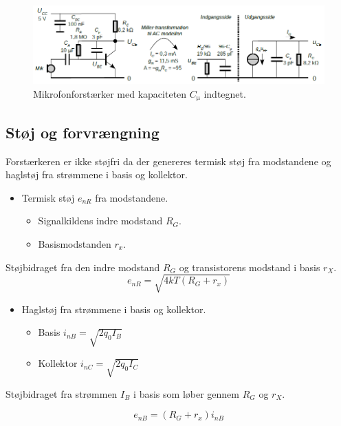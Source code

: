 \documentclass[danish]{article}
\begin{document}
\begin{figure} [H]
	\centering
	\includegraphics[width=\linewidth]{graphics/millertransformation}
	\caption{Mikrofonforstærker med kapaciteten $C_{\si{\micro}}$ indtegnet.}
	\label{fig:millertransformation}
\end{figure}

\newpage
\subsection{Støj og forvrængning}
Forstærkeren er ikke støjfri da der genereres termisk støj fra modstandene og haglstøj fra strømmene i basis og kollektor.
\begin{itemize}
	\item Termisk støj $e_{nR}$ fra modstandene.
	\begin{itemize}
		\item Signalkildens indre modstand $R_G$.
		\item Basismodstanden $r_x$.
	\end{itemize}
\end{itemize}

Støjbidraget fra den indre modstand $R_G$ og transistorens modstand i basis $r_X$.
\begin{equation} 
e_{nR} = \sqrt{4kT(R_G+r_x)}
\end{equation}

\begin{itemize}
	\item Haglstøj fra strømmene i basis og kollektor.
	\begin{itemize}
		\item Basis $i_{nB} = \sqrt{2 q_0 I_B}$
		\item Kollektor $i_{nC} = \sqrt{2 q_0 I_C}$
	\end{itemize}
\end{itemize}

Støjbidraget fra strømmen $I_B$ i basis som løber gennem $R_G$ og
$r_X$.

\begin{equation} 
e_{nB} = (R_G+r_x)i_{nB}
\end{equation}
\end{document}

